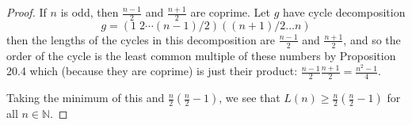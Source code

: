 \documentclass[11pt,dvipsnames]{book}
\numberwithin{equation}{section} %
\numberwithin{figure}{section} %
\numberwithin{table}{section} %
\begin{document}
\begin{exercise}
\begin{solution}
\begin{proof}
If $n$ is odd, then $\frac{n-1}{2}$ and $\frac{n+1}{2}$ are coprime. Let $g$ have cycle decomposition 
\[
g=(1\; 2\cdots (n-1)/2)((n+1)/2  ... n)
\]
then the lengths of the cycles in this decomposition are $\frac{n-1}{2}$ and $\frac{n+1}{2}$, and so the order of the cycle is the least common multiple of these numbers by Proposition 20.4 which (because they are coprime) is just their product: $\frac{n-1}{2}\frac{n+1}{2}= \frac{n^2-1}{4}$. 

Taking the minimum of this and $\frac{n}{2}\left(\frac{n}{2}-1\right)$, we see that $L(n)\geq \frac{n}{2}\left(\frac{n}{2}-1\right) $ for all $n\in\mathbb{N}$.
\end{proof}
\end{solution}
\end{exercise}
\end{document}
